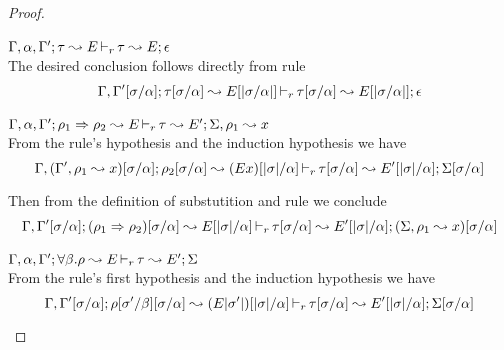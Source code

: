 \begin{proof}
\begin{description}
\setlength{\itemsep}{1em}
\item[\fbox{\texttt{(M-Simp)}}]\quad$\Gamma,\alpha,\Gamma'; \tau \leadsto E \mathop{\vdash_{r}} \tau \leadsto E; \epsilon$ \ \\
  The desired conclusion follows directly from rule 
\begin{equation*}
  \Gamma,\Gamma'[\sigma/\alpha]; \tau[\sigma/\alpha] \leadsto E[|\sigma/\alpha|] \mathop{\vdash_{r}} \tau[\sigma/\alpha] \leadsto E[|\sigma/\alpha|]; \epsilon
\end{equation*}

\item[\fbox{\texttt{(M-IApp)}}]\quad$\Gamma,\alpha,\Gamma'; \rho_1 \Rightarrow \rho_2 \leadsto E \mathop{\vdash_{r}} \tau \leadsto E'; \Sigma, \rho_1 \leadsto x$ \ \\
  From the rule's hypothesis and the induction hypothesis we have 
\begin{equation*}
  \Gamma,(\Gamma',\rho_1 \leadsto x)[\sigma/\alpha]; \rho_2[\sigma/\alpha] \leadsto (E x)[|\sigma|/\alpha] \mathop{\vdash_{r}} \tau[\sigma/\alpha] \leadsto E'[|\sigma|/\alpha]; \Sigma[\sigma/\alpha]
\end{equation*}

  Then from the definition of substutition and rule  we conclude
\begin{equation*}
  \Gamma,\Gamma'[\sigma/\alpha]; (\rho_1 \Rightarrow \rho_2)[\sigma/\alpha] \leadsto E[|\sigma|/\alpha] \mathop{\vdash_{r}} \tau[\sigma/\alpha] \leadsto E'[|\sigma|/\alpha]; (\Sigma,\rho_1 \leadsto x)[\sigma/\alpha]
\end{equation*}

\item[\fbox{\texttt{(M-TApp)}}]\quad$\Gamma,\alpha,\Gamma'; \forall\beta.\rho \leadsto E \mathop{\vdash_{r}} \tau \leadsto E'; \Sigma$ \ \\
  From the rule's first hypothesis and the induction hypothesis we have 
\begin{equation*}
  \Gamma,\Gamma'[\sigma/\alpha]; \rho[\sigma'/\beta][\sigma/\alpha] \leadsto (E |\sigma'|)[|\sigma|/\alpha] \mathop{\vdash_{r}} \tau[\sigma/\alpha] \leadsto E'[|\sigma|/\alpha]; \Sigma[\sigma/\alpha]
\end{equation*}


\end{description}
\end{proof}
